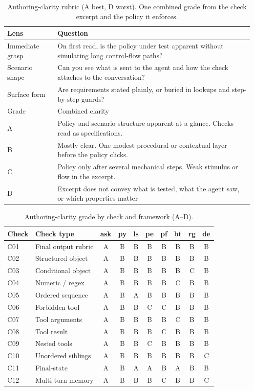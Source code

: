 \begin{table}[H]
\centering
\caption{Authoring-clarity rubric (A best, D worst). One combined grade from the check excerpt and the policy it enforces.}
\label{tab:authoring-clarity-rubric}
\small
\begin{tabular}{@{}lp{8.8cm}@{}}
\toprule
Lens & Question \\
\midrule
Immediate grasp & On first read, is the policy under test apparent without simulating long control-flow paths? \\
Scenario shape & Can you see what is sent to the agent and how the check attaches to the conversation? \\
Surface form & Are requirements stated plainly, or buried in lookups and step-by-step guards? \\
\midrule
Grade & Combined clarity \\
\midrule
A & Policy and scenario structure apparent at a glance. Checks read as specifications. \\
B & Mostly clear. One modest procedural or contextual layer before the policy clicks. \\
C & Policy only after several mechanical steps. Weak stimulus or flow in the excerpt. \\
D & Excerpt does not convey what is tested, what the agent saw, or which properties matter \\
\bottomrule
\end{tabular}
\end{table}

\begin{table}[H]
\centering
\caption{Authoring-clarity grade by check and framework (A--D).}
\label{tab:expressiveness-authoring-clarity}
\footnotesize
\begin{tabular}{@{}lp{2.4cm}cccccccc@{}}
\toprule
Check & Check type & ask & py & ls & pe & pf & bt & rg & de \\
\midrule
C01 & Final output rubric & A & B & B & B & B & B & B & B \\
C02 & Structured object & A & B & B & B & B & B & B & B \\
C03 & Conditional object & A & B & B & B & B & B & C & B \\
C04 & Numeric / regex & A & B & B & B & B & C & B & B \\
C05 & Ordered sequence & A & B & A & B & B & B & B & B \\
C06 & Forbidden tool & A & B & B & C & C & B & B & B \\
C07 & Tool arguments & A & B & B & B & B & C & B & B \\
C08 & Tool result & A & B & B & B & C & B & B & B \\
C09 & Nested tools & A & B & B & C & B & B & B & B \\
C10 & Unordered siblings & A & B & B & B & B & B & B & C \\
C11 & Final-state & A & B & A & A & B & A & B & B \\
C12 & Multi-turn memory & A & B & B & B & C & B & B & C \\
\bottomrule
\end{tabular}
\end{table}

